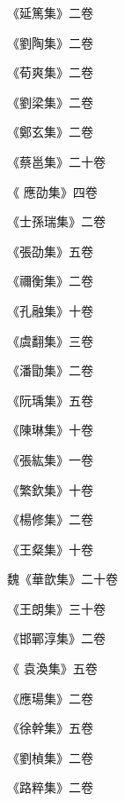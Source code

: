 \begin{pinyinscope}
 《延篤集》二卷



 《劉陶集》二卷



 《荀爽集》二卷



 《劉梁集》二卷



 《鄭玄集》二卷



 《蔡邕集》二十卷



 《
 應劭集》四卷



 《士孫瑞集》二卷



 《張劭集》五卷



 《禰衡集》二卷



 《孔融集》十卷



 《虞翻集》三卷



 《潘勖集》二卷



 《阮瑀集》五卷



 《陳琳集》十卷



 《張紘集》一卷



 《繁欽集》十卷



 《楊修集》二卷



 《王粲集》十卷



 魏《華歆集》二十卷



 《王朗集》三十卷



 《邯鄲淳集》二卷



 《
 袁渙集》五卷



 《應瑒集》二卷



 《徐幹集》五卷



 《劉楨集》二卷



 《路粹集》二卷




\end{pinyinscope}
